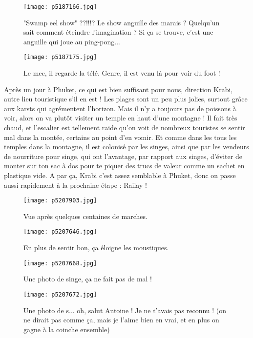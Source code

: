 \documentclass{book}
\begin{document}
\begin{figure}[h]
\centering
\texttt{[image: p5187166.jpg]}
\caption*{"Swamp eel show" ??!!!? Le show anguille des marais ? Quelqu'un sait comment éteindre l'imagination ? Si ça se trouve, c'est une anguille qui joue au ping-pong...}
\end{figure}


\begin{figure}[h]
\centering
\texttt{[image: p5187175.jpg]}
\caption*{Le mec, il regarde la télé. Genre, il est venu là pour voir du foot !}
\end{figure}

Après un jour à Phuket, ce qui est bien suffisant pour nous, direction Krabi, autre lieu touristique s'il en est ! Les plages sont un peu plus jolies, surtout grâce aux karsts qui agrémentent l'horizon. Mais il n'y a toujours pas de poissons à voir, alors on va plutôt visiter un temple en haut d'une montagne ! Il fait très chaud, et l'escalier est tellement raide qu'on voit de nombreux touristes se sentir mal dans la montée, certains au point d'en vomir. Et comme dans les tous les temples dans la montagne, il est colonisé par les singes, ainsi que par les vendeurs de nourriture pour singe, qui ont l'avantage, par rapport aux singes, d'éviter de monter sur ton sac à dos pour te piquer des trucs de valeur comme un sachet en plastique vide. A par ça, Krabi c'est assez semblable à Phuket, donc on passe aussi rapidement à la prochaine étape : Railay !


\begin{figure}[h]
\centering
\texttt{[image: p5207903.jpg]}
\caption*{Vue après quelques centaines de marches.}
\end{figure}




\begin{figure}[h]
\centering
\texttt{[image: p5207646.jpg]}
\caption*{En plus de sentir bon, ça éloigne les moustiques.}
\end{figure}


\begin{figure}[h]
\centering
\texttt{[image: p5207668.jpg]}
\caption*{Une photo de singe, ça ne fait pas de mal !}
\end{figure}


\begin{figure}[h]
\centering
\texttt{[image: p5207672.jpg]}
\caption*{Une photo de s... oh, salut Antoine ! Je ne t'avais pas reconnu ! (on ne dirait pas comme ça, mais je l'aime bien en vrai, et en plus on gagne à la coinche ensemble)}
\end{figure}
\end{document}
